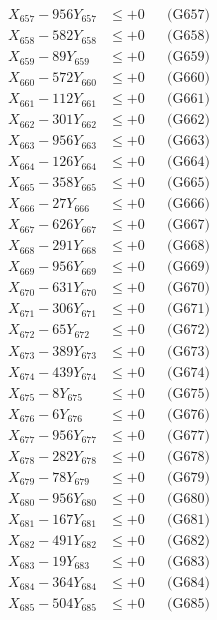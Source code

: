 \documentclass[a4paper,10pt]{article}
\begin{document}
{\begin{align}
X_{657} - 956Y_{657} &\leq +0 && \text{(G657)} \\
X_{658} - 582Y_{658} &\leq +0 && \text{(G658)} \\
X_{659} - 89Y_{659} &\leq +0 && \text{(G659)} \\
X_{660} - 572Y_{660} &\leq +0 && \text{(G660)} \\
\allowbreak
X_{661} - 112Y_{661} &\leq +0 && \text{(G661)} \\
X_{662} - 301Y_{662} &\leq +0 && \text{(G662)} \\
X_{663} - 956Y_{663} &\leq +0 && \text{(G663)} \\
X_{664} - 126Y_{664} &\leq +0 && \text{(G664)} \\
X_{665} - 358Y_{665} &\leq +0 && \text{(G665)} \\
X_{666} - 27Y_{666} &\leq +0 && \text{(G666)} \\
X_{667} - 626Y_{667} &\leq +0 && \text{(G667)} \\
X_{668} - 291Y_{668} &\leq +0 && \text{(G668)} \\
X_{669} - 956Y_{669} &\leq +0 && \text{(G669)} \\
X_{670} - 631Y_{670} &\leq +0 && \text{(G670)} \\
\allowbreak
X_{671} - 306Y_{671} &\leq +0 && \text{(G671)} \\
X_{672} - 65Y_{672} &\leq +0 && \text{(G672)} \\
X_{673} - 389Y_{673} &\leq +0 && \text{(G673)} \\
X_{674} - 439Y_{674} &\leq +0 && \text{(G674)} \\
X_{675} - 8Y_{675} &\leq +0 && \text{(G675)} \\
X_{676} - 6Y_{676} &\leq +0 && \text{(G676)} \\
X_{677} - 956Y_{677} &\leq +0 && \text{(G677)} \\
X_{678} - 282Y_{678} &\leq +0 && \text{(G678)} \\
X_{679} - 78Y_{679} &\leq +0 && \text{(G679)} \\
X_{680} - 956Y_{680} &\leq +0 && \text{(G680)} \\
\allowbreak
X_{681} - 167Y_{681} &\leq +0 && \text{(G681)} \\
X_{682} - 491Y_{682} &\leq +0 && \text{(G682)} \\
X_{683} - 19Y_{683} &\leq +0 && \text{(G683)} \\
X_{684} - 364Y_{684} &\leq +0 && \text{(G684)} \\
X_{685} - 504Y_{685} &\leq +0 && \text{(G685)} \\

\end{align}}
\end{document}
